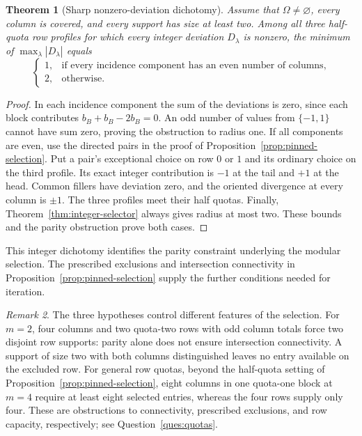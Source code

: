 \documentclass[11pt,reqno]{amsart}
\numberwithin{equation}{section}
\newtheorem{theorem}{Theorem}[section]
\theoremstyle{definition}
\theoremstyle{remark}
\newtheorem{remark}[theorem]{Remark}
\newcommand{\cO}{\Omega}
\begin{document}
\begin{theorem}[Sharp nonzero-deviation dichotomy]\label{thm:radius-dichotomy}
Assume that $\cO\ne\varnothing$, every column is covered, and every
support has size at least two. Among all three half-quota row profiles
for which every integer deviation $D_\lambda$ is nonzero, the minimum
of $\max_\lambda|D_\lambda|$ equals
\[
 \begin{cases}
 1,&\text{if every incidence component has an even number of columns},\\
 2,&\text{otherwise}.
 \end{cases}
\]
\end{theorem}
\begin{proof}
In each incidence component the sum of the deviations is zero, since
each block contributes $b_B+b_B-2b_B=0$. An odd number of values from
$\{-1,1\}$ cannot have sum zero, proving the obstruction to radius one.
If all components are even, use the directed pairs in the proof of
Proposition~\ref{prop:pinned-selection}. Put a pair's exceptional choice on row $0$
or $1$ and its ordinary choice on the third profile. Its exact integer
contribution is $-1$ at the tail and $+1$ at the head. Common fillers
have deviation zero, and the oriented divergence at every column is
$\pm1$. The three profiles meet their half quotas. Finally,
Theorem~\ref{thm:integer-selector} always gives radius at most two.
These bounds and the parity obstruction prove both cases.
\end{proof}

This integer dichotomy identifies the parity constraint underlying the
modular selection. The prescribed exclusions and intersection
connectivity in Proposition~\ref{prop:pinned-selection} supply the further
conditions needed for iteration.


\begin{remark}\label{rem:selector-limits}
The three hypotheses control different features of the selection. For $m=2$,
four columns and two quota-two rows with odd column totals force two disjoint
row supports: parity alone does not ensure intersection connectivity. A support
of size two with both columns distinguished leaves no entry available on the
excluded row. For general row quotas, beyond the half-quota setting of
Proposition~\ref{prop:pinned-selection}, eight columns in one quota-one block at
$m=4$ require at least eight selected entries, whereas the four rows
supply only four. These are obstructions to connectivity, prescribed exclusions, and row
capacity, respectively; see Question~\ref{ques:quotas}.
\end{remark}
\end{document}
